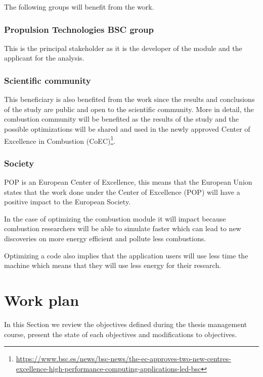 \justify

The following groups will benefit from the work.

\subsubsection{Propulsion Technologies BSC group}

\justify
This is the principal stakeholder as it is the developer of the module and the applicant for the analysis.

\subsubsection{Scientific community}

\justify
This beneficiary is also benefited from the work since the results and conclusions of the study are public and open to the scientific community. More in detail, the combustion community will be benefited as the results of the study and the possible optimizations will be shared and used in the newly approved Center of Excellence in Combustion (CoEC)\footnote{\url{https://www.bsc.es/news/bsc-news/the-ec-approves-two-new-centres-excellence-high-performance-computing-applications-led-bsc}}. 

\subsubsection{Society}

\justify
POP is an European Center of Excellence, this means that the European Union states that the work done under the Center of Excellence (POP) will have a positive impact to the European Society.

\justify
In the case of optimizing the combustion module it will impact because combustion researchers will be able to simulate faster which can lead to new discoveries on more energy efficient and pollute less combustions.

\justify
Optimizing a code also implies that the application users will use less time the machine which means that they will use less energy for their research.

\section{Work plan}
In this Section we review the objectives defined during the thesis management course, present the state of each objectives and modifications to objectives.


